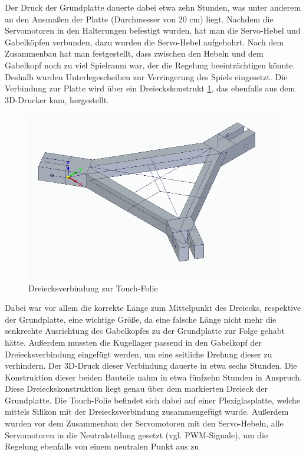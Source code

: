 \documentclass[12pt,a4paper,bibliography=totoc,listof=totoc]{scrartcl}
\begin{document}
Der Druck der Grundplatte dauerte dabei etwa zehn Stunden, was unter anderem an den Ausmaßen der Platte 
(Durchmesser von 20 cm) liegt. Nachdem die Servomotoren in den Halterungen befestigt wurden, hat man die 
Servo-Hebel und Gabelköpfen verbunden, dazu wurden die Servo-Hebel aufgebohrt. Nach dem Zusammenbau hat man 
festgestellt, dass zwischen den Hebeln und dem Gabelkopf noch zu viel Spielraum war, der die Regelung 
beeinträchtigen könnte. Deshalb wurden Unterlegescheiben zur Verringerung des Spiels eingesetzt. Die 
Verbindung zur Platte wird über ein Dreieckskonstrukt \ref{Dreiecksverbindung}, das ebenfalls aus dem 
3D-Drucker kam, hergestellt. 
\begin{figure}[htbp]
	\centering
	\includegraphics[scale = 0.44]{pics/BildDreieck}
	\caption{Dreiecksverbindung zur Touch-Folie}
	\label{Dreiecksverbindung}
\end{figure}
Dabei war vor allem die korrekte Länge zum Mittelpunkt des Dreiecks, 
respektive der Grundplatte, eine wichtige Größe, da eine falsche Länge nicht mehr die senkrechte 
Ausrichtung des Gabelkopfes zu der Grundplatte zur Folge gehabt hätte. Außerdem mussten die Kugellager 
passend in den Gabelkopf der Dreiecksverbindung eingefügt werden, um eine seitliche Drehung dieser zu 
verhindern.
Der 3D-Druck dieser Verbindung dauerte in etwa sechs Stunden. Die Konstruktion dieser beiden Bauteile 
nahm in etwa fünfzehn Stunden in Anspruch. Diese Dreieckskonstruktion liegt genau über dem markierten 
Dreieck der Grundplatte. Die Touch-Folie befindet sich dabei auf einer Plexiglasplatte, welche mittels 
Silikon mit der Dreiecksverbindung zusammengefügt wurde.
Außerdem wurden vor dem Zusammenbau der Servomotoren mit den Servo-Hebeln, alle Servomotoren in die 
Neutralstellung gesetzt (vgl. PWM-Signale), um die Regelung ebenfalls von einem neutralen Punkt aus zu 
\end{document}
